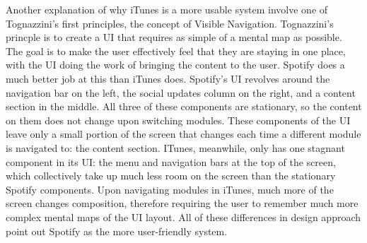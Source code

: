 \documentclass[12pt]{report}
\begin{document}
Another explanation of why iTunes is a more usable system involve one of Tognazzini's first principles, the concept of Visible Navigation. Tognazzini's princple is to create a UI that requires as simple of a mental map as possible. The goal is to make the user effectively feel that they are staying in one place, with the UI doing the work of bringing the content to the user. Spotify does a much better job at this than iTunes does. Spotify's UI revolves around the navigation bar on the left, the social updates column on the right, and a content section in the middle. All three of these components are stationary, so the content on them does not change upon switching modules. These components of the UI leave only a small portion of the screen that changes each time a different module is navigated to: the content section. ITunes, meanwhile, only has one stagnant component in its UI: the menu and navigation bars at the top of the screen, which collectively take up much less room on the screen than the stationary Spotify components. Upon navigating modules in iTunes, much more of the screen changes composition, therefore requiring the user to remember much more complex mental maps of the UI layout. All of these differences in design approach point out Spotify as the more user-friendly system.
\end{document}
